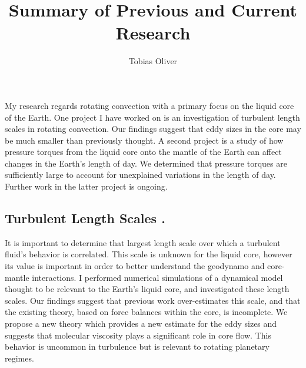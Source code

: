 \documentclass[12pt]{article}
\title{Summary of Previous and Current Research}
\author{Tobias Oliver}
\date{}
\begin{document}
\pagestyle{fancy}
\thispagestyle{fancy}
\fancyhf{} %
\fancyhead[L]{\textcolor{red}{Tobias Oliver\\
Summary of Previous and Current Research}}
\fancyfoot[R]{\thepage}
My research regards rotating convection with a primary focus on the liquid core of the Earth. One project I have worked on is an investigation of turbulent length scales in rotating convection. 
Our findings suggest that eddy sizes in the core may be much smaller than previously thought. 
A second project is a study of how pressure torques from the liquid core onto the mantle of the Earth can affect changes in the Earth's length of day. We determined that pressure torques are sufficiently large to account for unexplained variations in the length of day. Further work in the latter project is ongoing.
\subsection*{Turbulent Length Scales \cite{tO23}.}
It is important to determine that largest length scale over which a turbulent fluid's behavior is correlated. 
This scale is unknown for the liquid core, however its value is important in order to better understand the geodynamo and core-mantle interactions. I performed numerical simulations of a dynamical model thought to be relevant to the Earth's liquid core, and investigated these length scales. Our findings suggest that previous work over-estimates this scale, and that the existing theory, based on force balances within the core, is incomplete. We propose a new theory which provides a new estimate for the eddy sizes and suggests that molecular viscosity plays a significant role in core flow. This behavior is uncommon in turbulence but is relevant to rotating planetary regimes.
\end{document}

